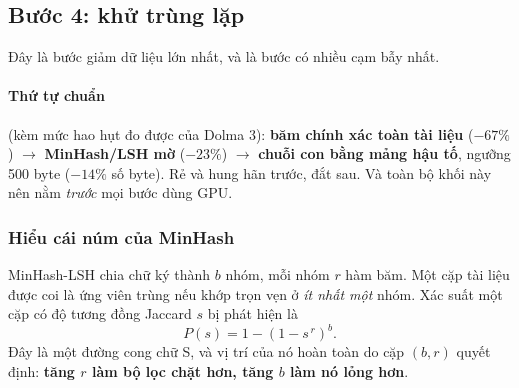 \subsection{Bước 4: khử trùng lặp}
\label{ssec:dedup}

Đây là bước giảm dữ liệu lớn nhất, và là bước có nhiều cạm bẫy nhất.

\paragraph{Thứ tự chuẩn} (kèm mức hao hụt đo được của Dolma 3): \textbf{băm chính xác toàn tài liệu} ($-67\%$) $\rightarrow$ \textbf{MinHash/LSH mờ} ($-23\%$) $\rightarrow$ \textbf{chuỗi con bằng mảng hậu tố}, ngưỡng 500 byte ($-14\%$ số byte). Rẻ và hung hãn trước, đắt sau. Và toàn bộ khối này nên nằm \emph{trước} mọi bước dùng GPU.

\subsubsection{Hiểu cái núm của MinHash}

MinHash-LSH chia chữ ký thành $b$ nhóm, mỗi nhóm $r$ hàm băm. Một cặp tài liệu được coi là ứng viên trùng nếu khớp trọn vẹn ở \emph{ít nhất một} nhóm. Xác suất một cặp có độ tương đồng Jaccard $s$ bị phát hiện là
\begin{equation}
	P(s) = 1 - \left(1 - s^{\,r}\right)^{b}.
	\label{eq:minhash_scurve}
\end{equation}
Đây là một đường cong chữ S, và vị trí của nó hoàn toàn do cặp $(b, r)$ quyết định: \textbf{tăng $r$ làm bộ lọc chặt hơn, tăng $b$ làm nó lỏng hơn}.

\begin{center}
\label{fig:minhash_s_curve}
\end{center}

